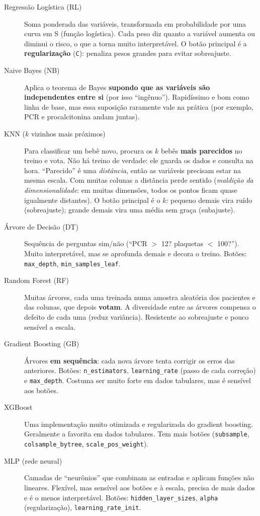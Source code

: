 \documentclass[11pt,a4paper]{article}
\newcommand{\cod}[1]{\texttt{#1}}
\begin{document}
\begin{description}
  \item[Regressão Logística (RL)] Soma ponderada das variáveis, transformada em probabilidade por uma curva em S (função logística). Cada peso diz quanto a variável aumenta ou diminui o risco, o que a torna muito interpretável. O botão principal é a \textbf{regularização} (\cod{C}): penaliza pesos grandes para evitar sobreajuste.
  \item[Naive Bayes (NB)] Aplica o teorema de Bayes \textbf{supondo que as variáveis são independentes entre si} (por isso ``ingênuo''). Rapidíssimo e bom como linha de base, mas essa suposição raramente vale na prática (por exemplo, PCR e procalcitonina andam juntas).
  \item[KNN ($k$ vizinhos mais próximos)] Para classificar um bebê novo, procura os $k$ bebês \textbf{mais parecidos} no treino e vota. Não há treino de verdade: ele guarda os dados e consulta na hora. ``Parecido'' é uma \emph{distância}, então as variáveis precisam estar na mesma escala. Com muitas colunas a distância perde sentido (\emph{maldição da dimensionalidade}: em muitas dimensões, todos os pontos ficam quase igualmente distantes). O botão principal é o $k$: pequeno demais vira ruído (sobreajuste); grande demais vira uma média sem graça (subajuste).
  \item[Árvore de Decisão (DT)] Sequência de perguntas sim/não (``PCR $>$ 12? plaquetas $<$ 100?''). Muito interpretável, mas se aprofunda demais e decora o treino. Botões: \cod{max\_depth}, \cod{min\_samples\_leaf}.
  \item[Random Forest (RF)] Muitas árvores, cada uma treinada numa amostra aleatória dos pacientes e das colunas, que depois \textbf{votam}. A diversidade entre as árvores compensa o defeito de cada uma (reduz variância). Resistente ao sobreajuste e pouco sensível a escala.
  \item[Gradient Boosting (GB)] Árvores \textbf{em sequência}: cada nova árvore tenta corrigir os erros das anteriores. Botões: \cod{n\_estimators}, \cod{learning\_rate} (passo de cada correção) e \cod{max\_depth}. Costuma ser muito forte em dados tabulares, mas é sensível aos botões.
  \item[XGBoost] Uma implementação muito otimizada e regularizada do gradient boosting. Geralmente a favorita em dados tabulares. Tem mais botões (\cod{subsample}, \cod{colsample\_bytree}, \cod{scale\_pos\_weight}).
  \item[MLP (rede neural)] Camadas de ``neurônios'' que combinam as entradas e aplicam funções não lineares. Flexível, mas sensível aos botões e à escala, precisa de mais dados e é o menos interpretável. Botões: \cod{hidden\_layer\_sizes}, \cod{alpha} (regularização), \cod{learning\_rate\_init}.
\end{description}
\end{document}
